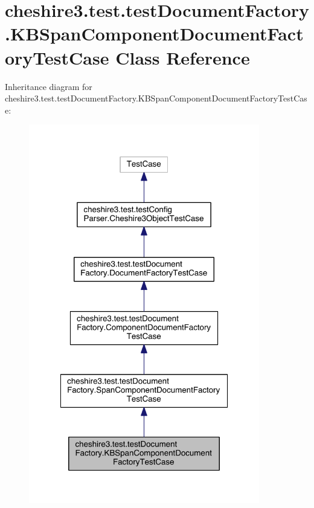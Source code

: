 \hypertarget{classcheshire3_1_1test_1_1test_document_factory_1_1_k_b_span_component_document_factory_test_case}{\section{cheshire3.\-test.\-test\-Document\-Factory.\-K\-B\-Span\-Component\-Document\-Factory\-Test\-Case Class Reference}
\label{classcheshire3_1_1test_1_1test_document_factory_1_1_k_b_span_component_document_factory_test_case}
}


Inheritance diagram for cheshire3.\-test.\-test\-Document\-Factory.\-K\-B\-Span\-Component\-Document\-Factory\-Test\-Case\-:
\nopagebreak
\begin{figure}[H]
\begin{center}
\leavevmode
\includegraphics[width=286pt]{classcheshire3_1_1test_1_1test_document_factory_1_1_k_b_span_component_document_factory_test_case__inherit__graph}
\end{center}
\end{figure}


